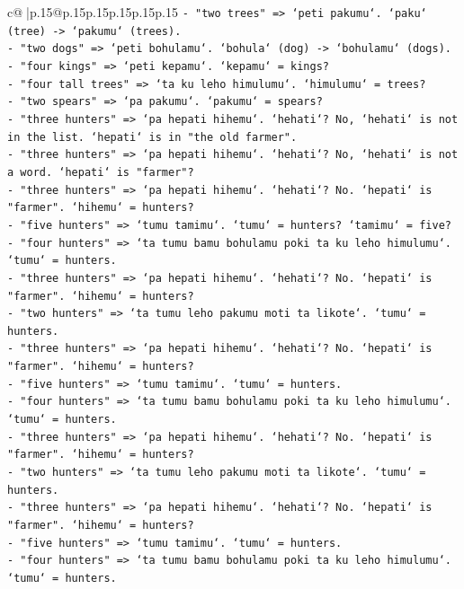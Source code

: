 \documentclass{article}
\begin{document}
{\begin{supertabular}{c@{$\;$}|p{.15\linewidth}@{}p{.15\linewidth}p{.15\linewidth}p{.15\linewidth}p{.15\linewidth}p{.15\linewidth}}
{{{\texttt{{-} "two trees" => `peti pakumu`. `paku` (tree) {-}> `pakumu` (trees).} \\
\texttt{{-} "two dogs" => `peti bohulamu`. `bohula` (dog) {-}> `bohulamu` (dogs).} \\
\texttt{{-} "four kings" => `peti kepamu`. `kepamu` = kings?} \\
\texttt{{-} "four tall trees" => `ta ku leho himulumu`. `himulumu` = trees?} \\
\texttt{{-} "two spears" => `pa pakumu`. `pakumu` = spears?} \\
\texttt{{-} "three hunters" => `pa hepati hihemu`. `hehati`? No, `hehati` is not in the list. `hepati` is in "the old farmer".} \\
\texttt{{-} "three hunters" => `pa hepati hihemu`. `hehati`? No, `hehati` is not a word. `hepati` is "farmer"?} \\
\texttt{{-} "three hunters" => `pa hepati hihemu`. `hehati`? No. `hepati` is "farmer". `hihemu` = hunters?} \\
\texttt{{-} "five hunters" => `tumu tamimu`. `tumu` = hunters? `tamimu` = five?} \\
\texttt{{-} "four hunters" => `ta tumu bamu bohulamu poki ta ku leho himulumu`. `tumu` = hunters.} \\
\texttt{{-} "three hunters" => `pa hepati hihemu`. `hehati`? No. `hepati` is "farmer". `hihemu` = hunters?} \\
\texttt{{-} "two hunters" => `ta tumu leho pakumu moti ta likote`. `tumu` = hunters.} \\
\texttt{{-} "three hunters" => `pa hepati hihemu`. `hehati`? No. `hepati` is "farmer". `hihemu` = hunters?} \\
\texttt{{-} "five hunters" => `tumu tamimu`. `tumu` = hunters.} \\
\texttt{{-} "four hunters" => `ta tumu bamu bohulamu poki ta ku leho himulumu`. `tumu` = hunters.} \\
\texttt{{-} "three hunters" => `pa hepati hihemu`. `hehati`? No. `hepati` is "farmer". `hihemu` = hunters?} \\
\texttt{{-} "two hunters" => `ta tumu leho pakumu moti ta likote`. `tumu` = hunters.} \\
\texttt{{-} "three hunters" => `pa hepati hihemu`. `hehati`? No. `hepati` is "farmer". `hihemu` = hunters?} \\
\texttt{{-} "five hunters" => `tumu tamimu`. `tumu` = hunters.} \\
\texttt{{-} "four hunters" => `ta tumu bamu bohulamu poki ta ku leho himulumu`. `tumu` = hunters.} \\
}}}
\end{supertabular}}
\end{document}
